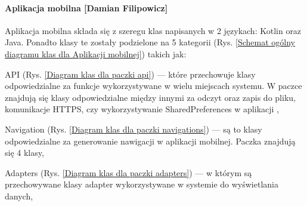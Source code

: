 		\paragraph*{Aplikacja mobilna [Damian Filipowicz]}
		Aplikacja mobilna składa się z szeregu klas napisanych w 2 językach: Kotlin oraz Java. Ponadto klasy te zostały podzielone na 5 kategorii (Rys. \ref{Schemat ogólny diagramu klas dla Aplikacji mobilnej}) takich jak:
		\begin{itemize*}
			\item API 
			(Rys. \ref{Diagram klas dla paczki api}) 
			---  które przechowuje klasy odpowiedzialne za funkcje wykorzystywane w wielu miejscach systemu. W paczce znajdują się klasy odpowiedzialne między innymi za odczyt oraz zapis do pliku, komunikacje HTTPS, czy wykorzystywanie SharedPreferences w aplikacji ,
			\item Navigation 
			(Rys. \ref{Diagram klas dla paczki navigations}) 
			--- są to klasy odpowiedzialne za generowanie nawigacji w aplikacji mobilnej. Paczka znajdują się 4 klasy,
			\item Adapters
			(Rys. \ref{Diagram klas dla paczki adapters}) 
			 --- w którym są przechowywane klasy adapter wykorzystywane w systemie do wyświetlania danych,
		\end{itemize*}
	
